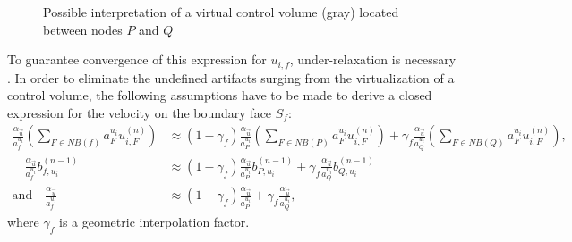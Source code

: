 \begin{figure}[h]
  
  \centering{}
  \caption{Possible interpretation of a virtual control volume (gray) located between nodes $P$ and $Q$ }
  \label{fig:virt}
\end{figure}

To guarantee convergence of this expression for \(u_{i,f}\), under-relaxation is necessary \cite{majumdar88}. In order to eliminate the undefined artifacts surging from the virtualization of a control volume, the following assumptions have to be made to derive a closed expression for the velocity on the boundary face \(S_f\):
\begin{subequations}
\label{eq:approxpwim}
\begin{align}
  \frac{\alpha_{\vec{u}}}{a_f^{u_i}} \left(\sum_{F \in NB(f)} a_F^{u_i} u_{i,F}^{(n)} \right)
  &\approx
  \left(1-\gamma_f\right) \frac{\alpha_{\vec{u}}}{a_P^{u_i}} \left(\sum_{F \in NB(P)} a_F^{u_i} u_{i,F}^{(n)} \right)
  +
  \gamma_f \frac{\alpha_{\vec{u}}}{a_Q^{u_i}} \left(\sum_{F \in NB(Q)} a_F^{u_i} u_{i,F}^{(n)} \right), \\[1em]
  \quad
  \frac{\alpha_{\vec{u}}}{a_f^{u_i}}b_{f,u_i}^{(n-1)} 
  &\approx
  \left(1-\gamma_f\right) \frac{\alpha_{\vec{u}}}{a_P^{u_i}} b_{P,u_i}^{(n-1)} 
  +
  \gamma_f \frac{\alpha_{\vec{u}}}{a_Q^{u_i}} b_{Q,u_i}^{(n-1)} \\[1em]
  \text{and}
  \quad
  \frac{\alpha_{\vec{u}}}{a_f^{u_i}} 
  &\approx
  \left(1-\gamma_f\right) \frac{\alpha_{\vec{u}}}{a_P^{u_i}} 
  +
  \gamma_f \frac{\alpha_{\vec{u}}}{a_Q^{u_i}},
\end{align}
\end{subequations}
where \(\gamma_f\) is a geometric interpolation factor. 

